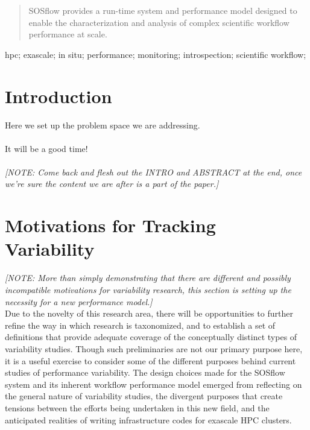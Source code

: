 \documentclass[12pt, conference, compsocconf]{IEEEtran}
\begin{document}




\maketitle


\begin{abstract}
SOSflow provides a run-time system and performance model designed to enable the 
characterization and analysis of complex scientific workflow performance at scale.


\end{abstract}

\begin{IEEEkeywords}
hpc; exascale; in situ; performance; monitoring; introspection; scientific 
workflow;

\end{IEEEkeywords}


%
\IEEEpeerreviewmaketitle


\section{Introduction}
Here we set up the problem space we are addressing.\\
\\
It will be a good time!\\
\\
\textit{[NOTE: Come back and flesh out the INTRO and ABSTRACT at the end, once 
we're sure the content we are after is a part of the paper.]}


\section{Motivations for Tracking Variability}
\textit{[NOTE: More than simply demonstrating that there are different and 
possibly incompatible motivations for variability research, this section is 
setting up the necessity for a new performance model.]}\\
Due to the novelty of this research area, there will be opportunities to 
further refine the way in which research is taxonomized, and to establish 
a set of definitions that provide adequate coverage of the conceptually distinct 
types of variability studies. Though such preliminaries are not our primary 
purpose here, it is a  useful  exercise to consider some of the different 
purposes behind current studies of performance variability. The design choices 
made for the SOSflow system and its inherent workflow performance model emerged 
from reflecting on the general nature of variability studies, the 
divergent purposes that create tensions between the efforts being 
undertaken in this new field, and the anticipated realities of writing 
infrastructure codes for exascale HPC clusters.
\end{document}
